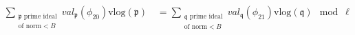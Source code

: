 \documentclass[preview]{standalone}
\begin{document}
\begin{align*}
\sum_{\substack{\mathfrak{p} \text{ prime ideal} \\ \text{of norm} < B}} val_{\mathfrak{p}}(\phi_{20}) \mathrm{vlog} \left( \mathfrak{p} \right) \quad = \sum_{\substack{\mathfrak{q} \text{ prime ideal} \\ \text{of norm} < B}} val_{\mathfrak{q}}(\phi_{21}) \mathrm{vlog} \left( \mathfrak{q} \right) \mod \ell
\end{align*}
\end{document}

